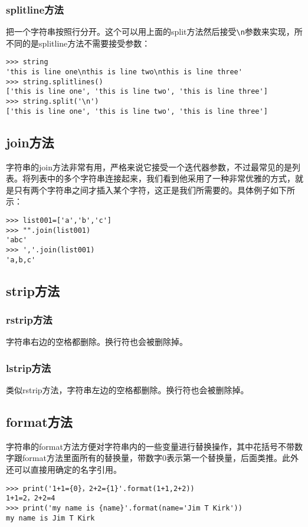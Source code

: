 \documentclass[12pt,oneside]{book}
\begin{document}
\begin{common-format}
\subsubsection{splitline方法}
把一个字符串按照行分开。这个可以用上面的split方法然后接受\verb+\n+参数来实现，所不同的是splitline方法不需要接受参数：
\begin{Verbatim}
>>> string
'this is line one\nthis is line two\nthis is line three'
>>> string.splitlines()
['this is line one', 'this is line two', 'this is line three']
>>> string.split('\n')
['this is line one', 'this is line two', 'this is line three']
\end{Verbatim}




\subsection{join方法}
字符串的join方法非常有用，严格来说它接受一个迭代器参数，不过最常见的是列表。将列表中的多个字符串连接起来，我们看到他采用了一种非常优雅的方式，就是只有两个字符串之间才插入某个字符，这正是我们所需要的。具体例子如下所示：
\begin{Verbatim}
>>> list001=['a','b','c']
>>> "".join(list001)
'abc'
>>> ','.join(list001)
'a,b,c'
\end{Verbatim}


\subsection{strip方法}

\subsubsection{rstrip方法}
字符串右边的空格都删除。换行符也会被删除掉。

\subsubsection{lstrip方法}
类似rstrip方法，字符串左边的空格都删除。换行符也会被删除掉。


\subsection{format方法}
字符串的format方法方便对字符串内的一些变量进行替换操作，其中花括号不带数字跟format方法里面所有的替换量，带数字0表示第一个替换量，后面类推。此外还可以直接用确定的名字引用。
\begin{Verbatim}
>>> print('1+1={0}，2+2={1}'.format(1+1,2+2))
1+1=2，2+2=4
>>> print('my name is {name}'.format(name='Jim T Kirk'))
my name is Jim T Kirk
\end{Verbatim}


\end{common-format}
\end{document}
